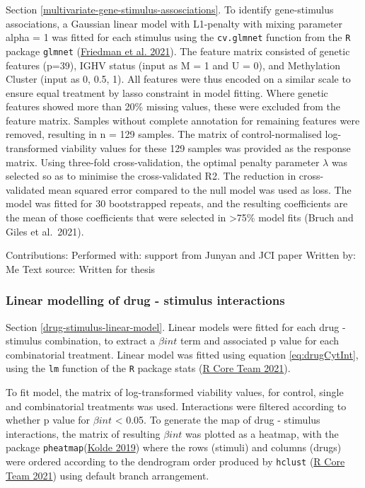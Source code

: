 \documentclass[11pt, a4paper, twosided]{book}
\begin{document}
Section \ref{multivariate-gene-stimulus-assosciations}. To identify gene-stimulus associations, a Gaussian linear model with L1-penalty with mixing parameter alpha = 1 was fitted for each stimulus using the \texttt{cv.glmnet} function from the \texttt{R} package \texttt{glmnet} (\protect\hyperlink{ref-R-glmnet}{Friedman et al. 2021}). The feature matrix consisted of genetic features (p=39), IGHV status (input as M = 1 and U = 0), and Methylation Cluster (input as 0, 0.5, 1). All features were thus encoded on a similar scale to ensure equal treatment by lasso constraint in model fitting. Where genetic features showed more than 20\% missing values, these were excluded from the feature matrix. Samples without complete annotation for remaining features were removed, resulting in n = 129 samples. The matrix of control-normalised log-transformed viability values for these 129 samples was provided as the response matrix. Using three-fold cross-validation, the optimal penalty parameter \(\lambda\) was selected so as to minimise the cross-validated R2. The reduction in cross-validated mean squared error compared to the null model was used as loss. The model was fitted for 30 bootstrapped repeats, and the resulting coefficients are the mean of those coefficients that were selected in \textgreater75\% model fits (Bruch and Giles et al.~2021).

Contributions:
Performed with: support from Junyan and JCI paper
Written by: Me
Text source: Written for thesis

\hypertarget{drug-stimulus-linear-model-method}{%
\subsubsection{Linear modelling of drug - stimulus interactions}\label{drug-stimulus-linear-model-method}}

Section \ref{drug-stimulus-linear-model}. Linear models were fitted for each drug - stimulus combination, to extract a \(\beta{int}\) term and associated p value for each combinatorial treatment. Linear model was fitted using equation \eqref{eq:drugCytInt}, using the \texttt{lm} function of the \texttt{R} package stats (\protect\hyperlink{ref-R-base}{R Core Team 2021}).

To fit model, the matrix of log-transformed viability values, for control, single and combinatorial treatments was used. Interactions were filtered according to whether p value for \(\beta{int}\) \textless{} 0.05. To generate the map of drug - stimulus interactions, the matrix of resulting \(\beta{int}\) was plotted as a heatmap, with the package \texttt{pheatmap}(\protect\hyperlink{ref-R-pheatmap}{Kolde 2019}) where the rows (stimuli) and columns (drugs) were ordered according to the dendrogram order produced by \texttt{hclust} (\protect\hyperlink{ref-R-base}{R Core Team 2021}) using default branch arrangement.
\end{document}
